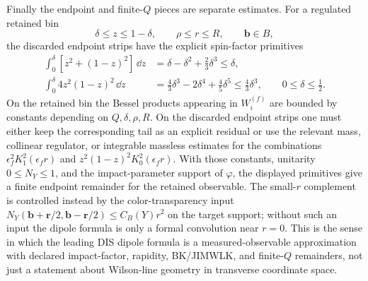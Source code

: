 \begin{controlledapproximation}
Finally the endpoint and finite-\(Q\) pieces are separate estimates.  For a
regulated retained bin
\[
  \delta\le z\le1-\delta,\qquad
  \rho\le r\le R,\qquad
  \mathbf b\in B ,
\]
the discarded endpoint strips have the explicit spin-factor primitives
\begin{align}
  \int_0^\delta [z^2+(1-z)^2]\,\dd z
  &=
  \delta-\delta^2+\frac23\delta^3
  \le \delta,
  \label{eq:qcd-small-x-transverse-endpoint-spin-bound}
\\
  \int_0^\delta 4z^2(1-z)^2\,\dd z
  &=
  \frac43\delta^3-2\delta^4+\frac45\delta^5
  \le \frac43\delta^3 ,
  \qquad 0\le\delta\le\frac12 .
  \label{eq:qcd-small-x-longitudinal-endpoint-spin-bound}
\end{align}
On the retained bin the Bessel products appearing in \(W_i^{(f)}\) are bounded
by constants depending on \(Q,\delta,\rho,R\).  On the discarded endpoint
strips one must either keep the corresponding tail as an explicit residual or
use the relevant mass, collinear regulator, or integrable massless estimates
for the combinations \(\epsilon_f^2K_1^2(\epsilon_f r)\) and
\(z^2(1-z)^2K_0^2(\epsilon_f r)\).  With those constants, unitarity
\(0\le N_Y\le1\), and the impact-parameter support of \(\varphi\), the
displayed primitives give a finite endpoint remainder for the retained
observable.  The small-\(r\) complement is controlled instead by the
color-transparency input
\(N_Y(\mathbf b+\mathbf r/2,\mathbf b-\mathbf r/2)\le C_B(Y)r^2\) on the
target support; without such an input the dipole formula is only a formal
convolution near \(r=0\).  This is the sense in which the leading DIS dipole
formula is a measured-observable approximation with declared impact-factor,
rapidity, BK/JIMWLK, and finite-\(Q\) remainders, not just a statement about
Wilson-line geometry in transverse coordinate space.
\end{controlledapproximation}

